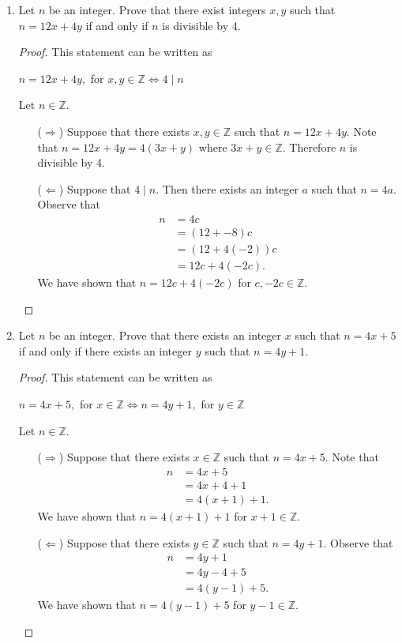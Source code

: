 \documentclass{article}
\theoremstyle{definition}
\begin{document}
    \begin{enumerate}
	\item Let $n$ be an integer. Prove that there exist integers $x, y$ such that $n=12x+4y$ if and only if $n$ is divisible by 4.
	    \begin{proof}
	    This statement can be written as 
		\begin{center}
		$n = 12x+4y,$ for $ x, y\in \mathbb{Z} \iff 4 \mid n$
		\end{center}
	    Let $n\in\mathbb{Z}$.
		\begin{itemize}	
		\item[($\Rightarrow$)] Suppose that there exists $x, y\in \mathbb{Z}$ such that $n = 12x+4y$. Note that $n = 12x+4y = 4(3x+y)$ where $3x+y\in \mathbb{Z}$. Therefore $n$ is divisible by 4.
		
    		\item[($\Leftarrow$)] Suppose that $4\mid n$. Then there exists an integer $a$ such that $n=4a$. Observe that 
   		 \begin{align*}
   		 n & = 4 c \\
    		& = (12 + -8) c\\
    		& = (12 + 4 (-2)) c\\
    		& = 12c + 4 (-2c).
    		\end{align*}
    		We have shown that $n = 12c + 4 (-2c)$ for $c, -2c \in\mathbb{Z}$.
  		\end{itemize}
	     \end{proof}

	\item Let $n$ be an integer. Prove that there exists an integer $x$ such that $n=4x+5$ if and only if there exists an integer $y$ such that $n=4y+1$.
	     \begin{proof}
	     This statement can be written as 
		\begin{center}
		$n = 4x+5,$ for $ x\in \mathbb{Z} \iff n = 4y+1,$ for $ y\in \mathbb{Z}$
		\end{center}
	    Let $n\in\mathbb{Z}$.
		\begin{itemize}	
		\item[($\Rightarrow$)] Suppose that there exists $x\in \mathbb{Z}$ such that $n = 4x+5$. Note that 
		\begin{align*}
		n &= 4x + 5\\
		& = 4x + 4 + 1\\
		& = 4(x+1) +1.
		\end{align*}
		We have shown that $n = 4(x+1) +1$ for $x+1 \in\mathbb{Z}$.
    		\item[($\Leftarrow$)] Suppose that there exists $y\in \mathbb{Z}$ such that $n = 4y+1$. Observe that 
   		 \begin{align*}
   		 n & = 4y + 1 \\
    		& = 4y - 4 + 5\\
    		& = 4 (y-1) + 5.
    		\end{align*}
    		We have shown that $n = 4 (y-1) + 5$ for $y-1 \in\mathbb{Z}$.
  		\end{itemize}
	     \end{proof}
    \end{enumerate}
\end{document}
